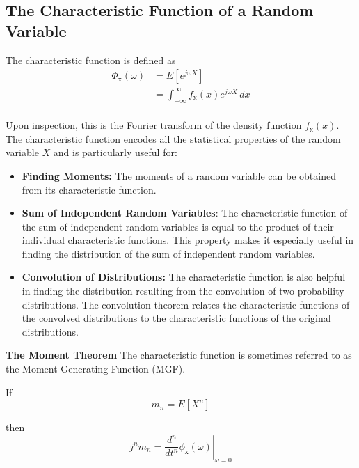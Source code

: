 \documentclass[12pt]{book}
\theoremstyle{definition}
\begin{document}
\subsection{The Characteristic Function of a Random Variable}\label{sec:moments}

The characteristic function is defined as 
\[
\begin{split}
    \Phi_\mathrm{x}(\omega) & = E\left[ e^{j\omega X} \right] \\
                    & = \int_{-\infty}^{\infty}f_\mathrm{x}(x) e^{j\omega X} \, dx
\end{split}
\]\\

Upon inspection, this is the Fourier transform of the density function $f_\mathrm{x}(x)$. The characteristic function encodes all the statistical properties of the random variable $X$ and is particularly useful for:

\begin{itemize}
    \item \textbf{Finding Moments:} The moments of a random variable can be obtained from its characteristic function. 
    \item \textbf{Sum of Independent Random Variables}: The characteristic function of the sum of independent random variables is equal to the product of their individual characteristic functions. This property makes it especially useful in finding the distribution of the sum of independent random variables.
    \item \textbf{Convolution of Distributions:} The characteristic function is also helpful in finding the distribution resulting from the convolution of two probability distributions. The convolution theorem relates the characteristic functions of the convolved distributions to the characteristic functions of the original distributions.
\end{itemize}


\textbf{The Moment Theorem} The characteristic function is sometimes referred to as the Moment Generating Function (MGF). 
\bigskip

If 
\[
m_n = E[X^n]
\]

then 
\[
j^n m_n = \left. {\frac{d^n}{dt^n} \phi_\mathrm{x}(\omega)} \right|_{\omega=0}
\]
\end{document}
